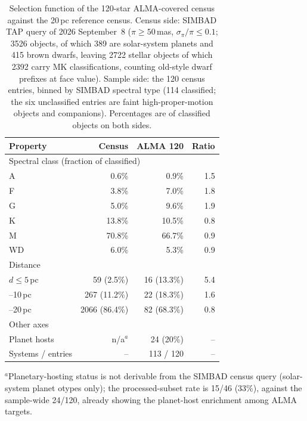 \documentclass{openjournal}
\begin{document}
\begin{table}
\centering
\small
\caption{Selection function of the 120-star ALMA-covered census
against the 20\,pc reference census. Census side: SIMBAD TAP query of
2026 September~8 ($\pi\ge50$\,mas, $\sigma_\pi/\pi\le0.1$; 3526
objects, of which 389 are solar-system planets and 415 brown dwarfs,
leaving 2722 stellar objects of which 2392 carry MK classifications,
counting old-style dwarf prefixes at face value). Sample side: the 120
census entries, binned by SIMBAD spectral type (114 classified; the
six unclassified entries are faint high-proper-motion objects and
companions). Percentages are of classified objects on both sides.}
\label{tab:selfunc}
\begin{tabular}{lrrr}
\toprule
Property & Census & ALMA 120 & Ratio \\
\midrule
\multicolumn{4}{l}{Spectral class (fraction of classified)} \\
\quad A & 0.6\% & 0.9\% & 1.5 \\
\quad F & 3.8\% & 7.0\% & 1.8 \\
\quad G & 5.0\% & 9.6\% & 1.9 \\
\quad K & 13.8\% & 10.5\% & 0.8 \\
\quad M & 70.8\% & 66.7\% & 0.9 \\
\quad WD & 6.0\% & 5.3\% & 0.9 \\
\multicolumn{4}{l}{Distance} \\
\quad $d\le5$\,pc & 59 (2.5\%) & 16 (13.3\%) & 5.4 \\
\quad 5--10\,pc & 267 (11.2\%) & 22 (18.3\%) & 1.6 \\
\quad 10--20\,pc & 2066 (86.4\%) & 82 (68.3\%) & 0.8 \\
\multicolumn{4}{l}{Other axes} \\
\quad Planet hosts & n/a$^{a}$ & 24 (20\%) & -- \\
\quad Systems / entries & -- & 113 / 120 & -- \\
\bottomrule
\end{tabular}

\smallskip
{\footnotesize $^{a}$Planetary-hosting status is not derivable from
the SIMBAD census query (solar-system planet otypes only); the
processed-subset rate is 15/46 (33\%), against the sample-wide 24/120,
already showing the planet-host enrichment among ALMA targets.}
\end{table}
\end{document}
